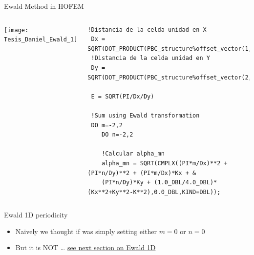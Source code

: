     \begin{frame}{\GreenTEw}

    
    \begin{block}{Ewald Method in HOFEM}
    \begin{columns}[T]
      \texttt{[image: Tesis\_Daniel\_Ewald\_1]} 
      \begin{lstlisting}[style=myFORTRANcodeS,basicstyle=\ttfamily\tiny]
!Distancia de la celda unidad en X
 Dx = SQRT(DOT_PRODUCT(PBC_structure%offset_vector(1,:),PBC_structure%offset_vector(1,:)))
 !Distancia de la celda unidad en Y
 Dy = SQRT(DOT_PRODUCT(PBC_structure%offset_vector(2,:),PBC_structure%offset_vector(2,:)))
    
 E = SQRT(PI/Dx/Dy)

 !Sum using Ewald transformation
 DO m=-2,2
    DO n=-2,2

    !Calcular alpha_mn
    alpha_mn = SQRT(CMPLX((PI*m/Dx)**2 + (PI*n/Dy)**2 + (PI*m/Dx)*Kx + &
    (PI*n/Dy)*Ky + (1.0_DBL/4.0_DBL)*(Kx**2+Ky**2-K**2),0.0_DBL,KIND=DBL));
      \end{lstlisting}
    \end{columns}
  \end{block}


  \begin{block}{Ewald 1D periodicity}
    \begin{itemize}
    \item Naively we thought if was simply setting
      either $m=0$ or $n=0$
    \item \alert{But it is NOT} \ldots
      \hyperlink{Ewald1D}{see next section on Ewald 1D}
    \end{itemize}
  \end{block}

  \end{frame}

